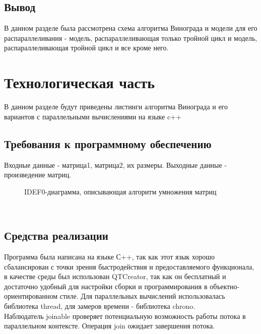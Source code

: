 \documentclass[a4paper, 14pt]{article}
\begin{document}
\subsection{Вывод}
		В данном разделе была рассмотрена схема алгоритма Винограда и модели для его распараллеливания - модель, распараллеливающая только тройной цикл и модель, распараллеливающая тройной цикл и все кроме него.\\
        
    	\newpage
        \section{Технологическая часть}
        
        В данном разделе будут приведены листинги алгоритма Винограда и его вариантов с параллельными вычислениями на языке c++\\
        \subsection{Требования к программному обеспечению}
        Входные данные - матрица1, матрица2, их размеры.
        Выходные данные - произведение матриц.
          \begin{figure}[h]
        	\caption{IDEF0-диаграмма, описывающая алгоритм умножения матриц}
        	\label{fig:schema_vinograd_optimized}
        \end{figure} \\
		\subsection{Средства реализации}
		Программа была написана на языке С++\cite{c++}, так как этот язык хорошо сбалансирован с точки зрения быстродействия и предоставляемого функционала, в качестве среды был использован QTCreator\cite{qtc}, так как он бесплатный и достаточно удобный для настройки сборки и программирования в объектно-ориентированном стиле. Для параллельных вычислений использовалась библиотека thread\cite{thread}, для замеров времени - библиотека chrono\cite{chrono}.\\

Наблюдатель joinable проверяет потенциальную возможность работы потока в параллельном контексте.
Операция join ожидает завершения потока\cite{multik}.\\
\end{document}
